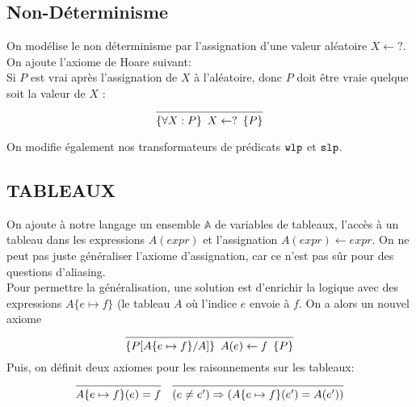 \documentclass{cours}
\begin{document}
\subsection{Non-Déterminisme}
On modélise le non déterminisme par l'assignation d'une valeur aléatoire $X \gets ?$.
On ajoute l'axiome de Hoare suivant: \\
Si $P$ est vrai après l'assignation de $X$ à l'aléatoire, donc $P$ doit être vraie quelque soit la valeur de $X$ :
\begin{equation*}
	\begin{prooftree}
		\infer0{\hoare{\forall X:P}{X \gets ?}{P}}
	\end{prooftree}
\end{equation*}

On modifie également nos transformateurs de prédicats $\texttt{wlp}$ et $\texttt{slp}$.

\subsection{TABLEAUX}
On ajoute à notre langage un ensemble $\mathbb{A}$ de variables de tableaux, l'accès à un tableau dans les expressions $A(expr)$ et l'assignation $A(expr) \gets expr$.
On ne peut pas juste généraliser l'axiome d'assignation, car ce n'est pas sûr pour des questions d'aliasing.\\
Pour permettre la généralisation, une solution est d'enrichir la logique avec des expressions $A\{e \mapsto f\}$ (le tableau $A$ où l'indice $e$ envoie à $f$. On a alors un nouvel axiome
\begin{equation*}
	\begin{prooftree}
		\infer0{\hoare{P[A\{e \mapsto f\}/A]}{A(e) \gets f}{P}}
	\end{prooftree}
\end{equation*}
Puis, on définit deux axiomes pour les raisonnements sur les tableaux:
\begin{equation*}
	\begin{prooftree}
		\infer0{A\{e \mapsto f\}(e) = f}
	\end{prooftree}
	\quad
	\begin{prooftree}
		\infer0{(e \neq e') \Rightarrow \left(A\{e \mapsto f\}(e') = A(e')\right)}
	\end{prooftree}
\end{equation*}
\end{document}
